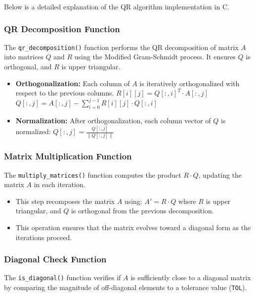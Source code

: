 \documentclass[12pt]{article}
\begin{document}
Below is a detailed explanation of the QR algorithm implementation in C.

\subsubsection{QR Decomposition Function}
The \texttt{qr\_decomposition()} function performs the QR decomposition of matrix $A$ into matrices $Q$ and $R$ using the Modified Gram-Schmidt process. It ensures $Q$ is orthogonal, and $R$ is upper triangular.



\begin{itemize}
    \item \textbf{Orthogonalization:} Each column of $A$ is iteratively orthogonalized with respect to the previous columns.  
    $R[i][j] = Q[:, i]^T \cdot A[:, j]$  
    $Q[:, j] = A[:, j] - \sum_{i=0}^{j-1} R[i][j] \cdot Q[:, i]$
    \item \textbf{Normalization:} After orthogonalization, each column vector of $Q$ is normalized:  
    $Q[:, j] = \frac{Q[:, j]}{\|Q[:, j]\|}$
\end{itemize}

\subsubsection{Matrix Multiplication Function}
The \texttt{multiply\_matrices()} function computes the product $R \cdot Q$, updating the matrix $A$ in each iteration.



\begin{itemize}
    \item This step recomposes the matrix $A$ using:  
    $A' = R \cdot Q$  
    where $R$ is upper triangular, and $Q$ is orthogonal from the previous decomposition.
    \item This operation ensures that the matrix evolves toward a diagonal form as the iterations proceed.
\end{itemize}

\subsubsection{Diagonal Check Function}
The \texttt{is\_diagonal()} function verifies if $A$ is sufficiently close to a diagonal matrix by comparing the magnitude of off-diagonal elements to a tolerance value (\texttt{TOL}).
\end{document}

